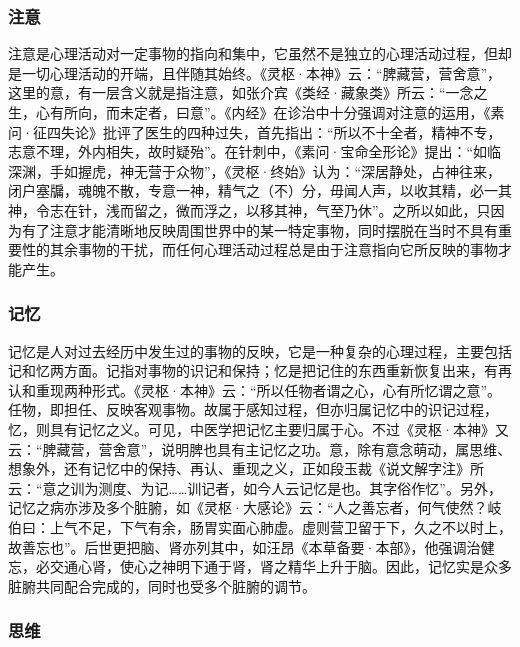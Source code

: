 \documentclass[12pt]{ctexbook}
\begin{document}
\subsubsection{注意}%

注意是心理活动对一定事物的指向和集中，它虽然不是独立的心理活动过程，但却是一切心理活动的开端，且伴随其始终。《灵枢·本神》云：“脾藏营，营舍意”，这里的意，有一层含义就是指注意，如张介宾《类经·藏象类》所云：“一念之生，心有所向，而未定者，曰意”。《内经》在诊治中十分强调对注意的运用，《素问·征四失论》批评了医生的四种过失，首先指出：“所以不十全者，精神不专，志意不理，外内相失，故时疑殆”。在针刺中，《素问·宝命全形论》提出：“如临深渊，手如握虎，神无营于众物”，《灵枢·终始》认为：“深居静处，占神往来，闭户塞牖，魂魄不散，专意一神，精气之（不）分，毋闻人声，以收其精，必一其神，令志在针，浅而留之，微而浮之，以移其神，气至乃休”。之所以如此，只因为有了注意才能清晰地反映周围世界中的某一特定事物，同时摆脱在当时不具有重要性的其余事物的干扰，而任何心理活动过程总是由于注意指向它所反映的事物才能产生。

\subsubsection{记忆}%

记忆是人对过去经历中发生过的事物的反映，它是一种复杂的心理过程，主要包括记和忆两方面。记指对事物的识记和保持；忆是把记住的东西重新恢复出来，有再认和重现两种形式。《灵枢·本神》云：“所以任物者谓之心，心有所忆谓之意”。任物，即担任、反映客观事物。故属于感知过程，但亦归属记忆中的识记过程，忆，则具有记忆之义。可见，中医学把记忆主要归属于心。不过《灵枢·本神》又云：“脾藏营，营舍意”，说明脾也具有主记忆之功。意，除有意念萌动，属思维、想象外，还有记忆中的保持、再认、重现之义，正如段玉裁《说文解字注》所云：“意之训为测度、为记……训记者，如今人云记忆是也。其字俗作忆”。另外，记忆之病亦涉及多个脏腑，如《灵枢·大感论》云：“人之善忘者，何气使然？岐伯曰：上气不足，下气有余，肠胃实面心肺虚。虚则营卫留于下，久之不以时上，故善忘也”。后世更把脑、肾亦列其中，如汪昂《本草备要·本部》，他强调治健忘，必交通心肾，使心之神明下通于肾，肾之精华上升于脑。因此，记忆实是众多脏腑共同配合完成的，同时也受多个脏腑的调节。

\subsubsection{思维}%
\end{document}
